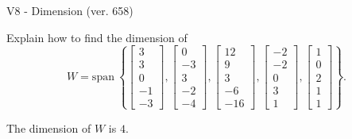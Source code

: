 \begin{exercise}
  \begin{exerciseTitle}V8 - Dimension (ver. 658)\end{exerciseTitle}
  \begin{exerciseStatement}
    Explain how to find the dimension of 
\[W=\mathrm{span}\ \left\{\left[\begin{array}{r}
3 \\
3 \\
0 \\
-1 \\
-3
\end{array}\right] , \left[\begin{array}{r}
0 \\
-3 \\
3 \\
-2 \\
-4
\end{array}\right] , \left[\begin{array}{r}
12 \\
9 \\
3 \\
-6 \\
-16
\end{array}\right] , \left[\begin{array}{r}
-2 \\
-2 \\
0 \\
3 \\
1
\end{array}\right] , \left[\begin{array}{r}
1 \\
0 \\
2 \\
1 \\
1
\end{array}\right]\right\}.\]



  \end{exerciseStatement}
  \begin{exerciseAnswer}
   The dimension of \(W\) is  \(4\).
  


  \end{exerciseAnswer}
\end{exercise}